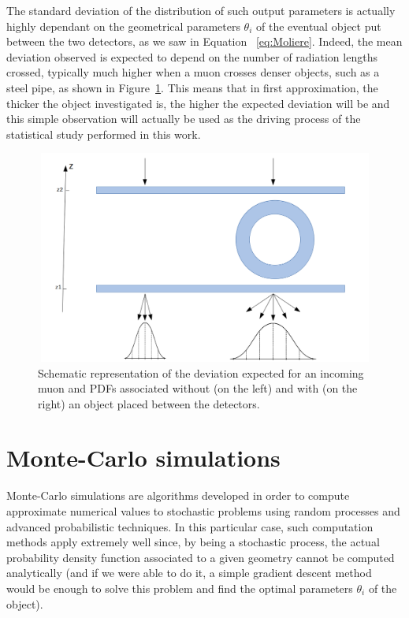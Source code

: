 \documentclass[a4paper, 11pt]{report}
\begin{document}
The standard deviation of the distribution of such output parameters is actually highly dependant on the geometrical parameters $\theta_i$ of the eventual object put between the two detectors, as we saw in Equation ~\ref{eq:Moliere}. Indeed, the mean deviation observed is expected to depend on the number of radiation lengths crossed, typically much higher when a muon crosses denser objects, such as a steel pipe, as shown in Figure~\ref{fig:deviation}. This means that in first approximation, the thicker the object investigated is, the higher the expected deviation will be and this simple observation will actually be used as the driving process of the statistical study performed in this work.

\begin{figure}[htbp]
\centering
\includegraphics[width=12cm, height=7cm]{figs/pdfs.png}
\caption{Schematic representation of the deviation expected for an incoming muon and PDFs associated without (on the left) and with (on the right) an object placed between the detectors.}
\label{fig:deviation}
\end{figure}

\section{Monte-Carlo simulations} \label{sec:MC}

Monte-Carlo simulations are algorithms developed in order to compute approximate numerical values to stochastic problems using random processes and advanced probabilistic techniques. In this particular case, such computation methods apply extremely well since, by being a stochastic process, the actual probability density function associated to a given geometry cannot be computed analytically (and if we were able to do it, a simple gradient descent method would be enough to solve this problem and find the optimal parameters $\theta_i$ of the object). 
\end{document}
